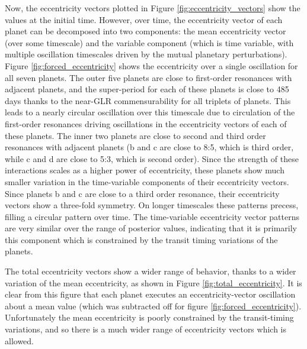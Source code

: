 \documentclass[twocolumn]{aastex63}
\begin{document}
Now, the eccentricity vectors plotted in Figure \ref{fig:eccentricity_vectors} show the
values at the initial time. However, over time, the eccentricity vector of each planet can be decomposed into two components: the mean eccentricity vector (over some timescale) and the variable component (which is time variable, with multiple oscillation timescales driven by the mutual planetary perturbations).   Figure \ref{fig:forced_eccentricity}
shows the eccentricity over a single oscillation for all seven planets.  The outer five
planets are close to first-order resonances with adjacent planets, and the super-period
for each of these planets is close to 485 days thanks to the near-GLR commensurability
for all triplets of planets.  This leads to a nearly circular oscillation over this timescale
due to circulation of the first-order resonances driving oscillations in the eccentricity
vectors of each of these planets.  The inner two planets are close to second and third
order resonances with adjacent planets (b and c are close to 8:5, which is third order,
while c and d are close to 5:3, which is second order).  Since the strength of these
interactions scales as a higher power of eccentricity, these planets show much smaller variation
in the time-variable components of their eccentricity vectors.  Since planets b and c are
close to a third order resonance,
their eccentricity vectors show a three-fold symmetry.  On longer timescales these patterns
precess, filling a circular pattern over time.  The time-variable eccentricity vector patterns are
very similar over the range of posterior values, indicating that it is primarily this
component which is constrained by the transit timing variations of the planets.

The total eccentricity vectors show a wider range of behavior, thanks to a wider variation
of the mean eccentricity, as shown in Figure \ref{fig:total_eccentricity}.  It is clear
from this figure that each planet executes an eccentricity-vector oscillation about a
mean value (which was subtracted off for figure \ref{fig:forced_eccentricity}).  Unfortunately the mean eccentricity is poorly constrained by the transit-timing
variations, and so there is a much wider range of eccentricity vectors which is allowed.
\end{document}
